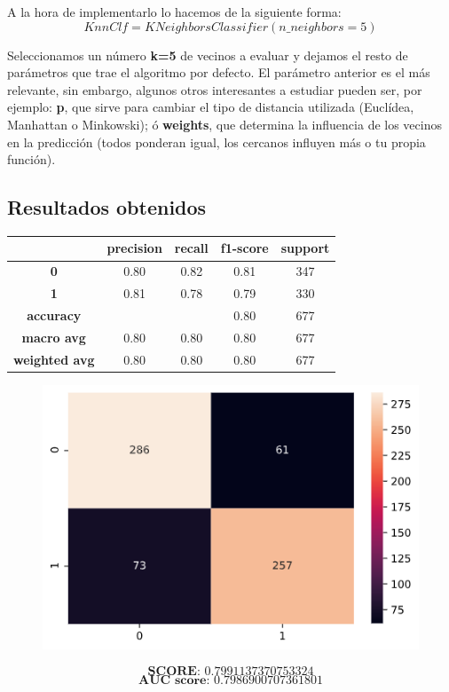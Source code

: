 \documentclass[11pt,a4paper]{article}
\begin{document}
\newpage
A la hora de implementarlo lo hacemos de la siguiente forma:
$$KnnClf = KNeighborsClassifier(n\_neighbors=5)$$

Seleccionamos un número \textbf{k=5} de vecinos a evaluar y dejamos el resto de parámetros que trae el algoritmo por defecto. El
parámetro anterior es el más relevante, sin embargo, algunos otros interesantes a estudiar pueden ser, por ejemplo: \textbf{p},
que sirve para cambiar el tipo de distancia utilizada (Euclídea, Manhattan o Minkowski); ó \textbf{weights}, que determina la
influencia de los vecinos en la predicción (todos ponderan igual, los cercanos influyen más o tu propia función).

\subsection*{Resultados obtenidos}
\begin{table}[H]
    \centering
    \begin{tabular}{c|cccc}
        \textbf{} & \textbf{precision} & \textbf{recall} & \textbf{f1-score} & \textbf{support} \\ \hline
        \textbf{0} & 0.80 & 0.82 & 0.81 & 347 \\
        \textbf{1} & 0.81 & 0.78 & 0.79 & 330 \\ \hline
        \textbf{accuracy} &  &  & 0.80 & 677 \\
        \textbf{macro avg} & 0.80 & 0.80 & 0.80 & 677 \\
        \textbf{weighted avg} & 0.80 & 0.80 & 0.80 & 677
    \end{tabular}
\end{table}

\begin{figure}[H]
    \centering
    \includegraphics[scale=0.5]{img/matrix-knn.png}    
\end{figure}
$$\textbf{SCORE:  } 0.7991137370753324$$
$$\textbf{AUC score:  } 0.7986900707361801$$
\end{document}
